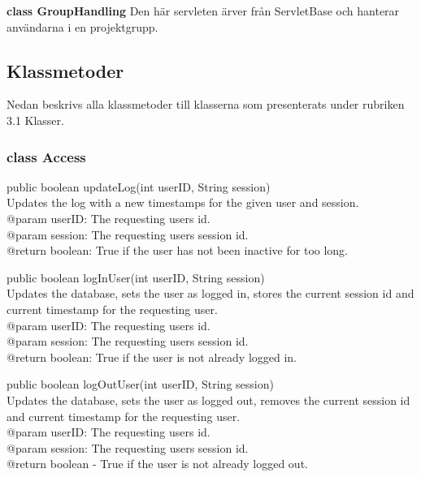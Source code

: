 \documentclass[a4paper]{article}
\begin{document}
\vspace{5mm}
\begin{hangparas}{1.5em}{1}
\textbf{class GroupHandling} Den här servleten ärver från ServletBase och hanterar användarna i en projektgrupp. \\
\end{hangparas}

\subsection{Klassmetoder}
Nedan beskrivs alla klassmetoder till klasserna som presenterats under rubriken 3.1 Klasser.

\subsubsection{class Access}

\begin{hangparas}{1.5em}{1}
public boolean updateLog(int userID, String session)\\
Updates the log with a new timestamps for the given user and session. \\
@param userID: The requesting users id.\\
@param session: The requesting users session id.\\
@return boolean: True if the user has not been inactive for too long.
\end{hangparas}

\vspace{5mm}
\begin{hangparas}{1.5em}{1}
public boolean logInUser(int userID, String session)\\
Updates the database, sets the user as logged in, stores the current session id and current timestamp for the requesting user.\\
@param userID: The requesting users id.\\
@param session: The requesting users session id.\\
@return boolean: True if the user is not already logged in.
\end{hangparas}

\vspace{5mm}
\begin{hangparas}{1.5em}{1}
public boolean logOutUser(int userID, String session)\\
Updates the database, sets the user as logged out, removes the current session id and current timestamp for the requesting user.\\
@param userID: The requesting users id.\\
@param session: The requesting users session id.\\
@return boolean - True if the user is not already logged out.\\
\end{hangparas}
\end{document}
